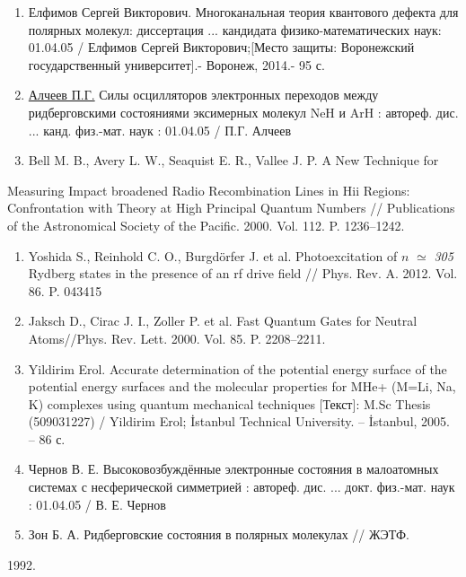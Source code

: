 \begin{enumerate}
\item Елфимов Сергей
Викторович. Многоканальная теория квантового дефекта для полярных молекул: диссертация ... кандидата физико-математических
наук: 01.04.05 / Елфимов
Сергей
Викторович;[Место
защиты: Воронежский государственный
университет].-
Воронеж, 2014.- 95 с.
\item
\href{http://xn--90ax2c.xn--p1ai/search/?f_field%5bauthorbook%5d=f/authorbook/%D0%B0%D0%BB%D1%87%D0%B5%D0%B5%D0%B2+%D0%BF.%D0%B3.}{Алчеев П.Г.} Силы осцилляторов электронных переходов между ридберговскими состояниями эксимерных молекул NeH и ArH : автореф. дис. ... канд. физ.-мат. наук : 01.04.05 / П.Г. Алчеев
\item \foreignlanguage{english}{Bell M. B., Avery L. W., Seaquist E. R., Vallee J. P. A New Technique for}
\end{enumerate}
\foreignlanguage{english}{Measuring Impact broadened Radio Recombination Lines in Hii Regions: Confrontation with Theory
at High Principal Quantum Numbers // Publications of the Astronomical Society of the Pacific. 2000. Vol. 112. P.
1236--1242.}

\liststyleWWNumi
\setcounter{saveenum}{\value{enumi}}
\begin{enumerate}
\setcounter{enumi}{\value{saveenum}}
\item \foreignlanguage{english}{Yoshida S., Reinhold C. O., Burgd\"orfer J. et al. Photoexcitation of }\newline
$n$\foreignlanguage{english}{
}\foreignlanguage{english}{\textit{${\simeq}$}}\foreignlanguage{english}{
}\foreignlanguage{english}{\textit{305}}\foreignlanguage{english}{ Rydberg states in the presence of an rf drive field
// Phys. Rev. A. 2012. Vol. 86. P. 043415}
\item \foreignlanguage{english}{Jaksch D., Cirac J. I., Zoller P. et al. Fast Quantum Gates for Neutral Atoms//Phys.
Rev. Lett. 2000. Vol. 85. P. 2208--2211.}
\item \foreignlanguage{english}{Yildirim Erol. Accurate determination of the potential energy surface of the potential
energy surfaces and the molecular properties for MHe+ (M=Li, Na, K) complexes using quantum mechanical techniques
[}Текст\foreignlanguage{english}{]: M.Sc Thesis (509031227) / Yildirim Erol; \.Istanbul
Technical University. -- \.Istanbul, 2005. -- 86 }с\foreignlanguage{english}{.}
\item Чернов В. Е.
Высоковозбуждённые электронные состояния в малоатомных системах с несферической симметрией : автореф. дис. ... докт.
физ.-мат. наук : 01.04.05 / В. Е.
Чернов
\item Зон Б. А.
Ридберговские состояния в полярных
молекулах // ЖЭТФ.
\end{enumerate}
\foreignlanguage{english}{1992. }

